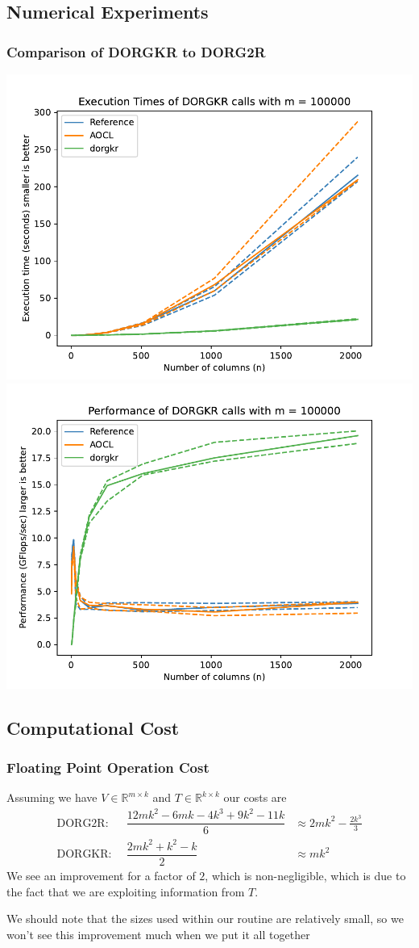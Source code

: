 \documentclass[12pt,aspectratio=169]{beamer}
\newcommand{\R}{\mathbb{R}}
\begin{document}
    \subsection{Numerical Experiments}
    \begin{frame}
        \frametitle{Comparison of DORGKR to DORG2R}
        \begin{center}
        \includegraphics[width=.45\textwidth]{figures/timeDORGKR.pdf}
        \includegraphics[width=.45\textwidth]{figures/flopDORGKR.pdf}
        \end{center}
    \end{frame}
    \subsection{Computational Cost}
    \begin{frame}
        \frametitle{Floating Point Operation Cost}
        Assuming we have $V\in\R^{m\times k}$ and $T\in\R^{k\times k}$ our costs are 
        $$
        \begin{aligned}
            \text{DORG2R: }&\, \dfrac{12mk^2 - 6mk -4k^3 +9k^2 - 11k}{6} &\approx 2mk^2 - \frac{2k^3}{3}\\
            \text{DORGKR: }&\, \dfrac{2mk^2 + k^2 - k}{2} &\approx mk^2
        \end{aligned}
        $$
        We see an improvement for a factor of $2$, which is non-negligible, which is due to the fact that we are exploiting information from $T$.

        We should note that the sizes used within our routine are relatively small, so we won't see 
        this improvement much when we put it all together
    \end{frame}
\end{document}
